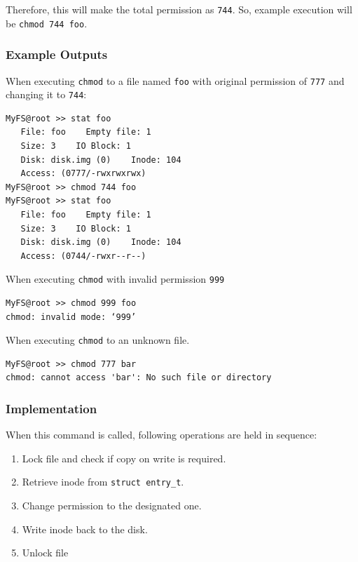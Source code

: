 \documentclass{homework}
\begin{document}
Therefore, this will make the total permission as \texttt{744}. So, example execution will be \texttt{chmod 744 foo}.
\subsubsection{Example Outputs}
When executing \texttt{chmod} to a file named \texttt{foo} with original permission of \texttt{777} and changing it to \texttt{744}:
\\
\begin{center}
\begin{code}
\begin{verbatim}
MyFS@root >> stat foo
   File: foo    Empty file: 1
   Size: 3    IO Block: 1
   Disk: disk.img (0)    Inode: 104
   Access: (0777/-rwxrwxrwx)
MyFS@root >> chmod 744 foo
MyFS@root >> stat foo
   File: foo    Empty file: 1
   Size: 3    IO Block: 1
   Disk: disk.img (0)    Inode: 104
   Access: (0744/-rwxr--r--)
\end{verbatim}
\end{code}
\end{center}

\pagebreak
When executing \texttt{chmod} with invalid permission \texttt{999}
\\
\begin{center}
\begin{code}
\begin{verbatim}
MyFS@root >> chmod 999 foo
chmod: invalid mode: ‘999’
\end{verbatim}
\end{code}
\end{center}
When executing \texttt{chmod} to an unknown file.
\\
\begin{center}
\begin{code}
\begin{verbatim}
MyFS@root >> chmod 777 bar
chmod: cannot access 'bar': No such file or directory
\end{verbatim}
\end{code}
\end{center}

\subsubsection{Implementation}
When this command is called, following operations are held in sequence:
\begin{enumerate}
    \item Lock file and check if copy on write is required.
    \item Retrieve inode from \texttt{struct entry_t}.
    \item Change permission to the designated one.
    \item Write inode back to the disk.
    \item Unlock file
\end{enumerate}
\end{document}
